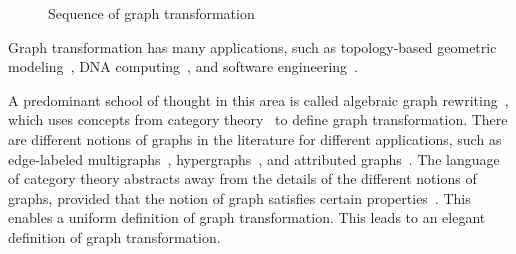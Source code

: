 \begin{figure}[H]
{
}
        \caption{Sequence of graph transformation}
        \label{fig:intro_sequence_of_transformation}
    \end{figure}


 Graph transformation has many applications, such as topology-based geometric modeling~\cite{poudret2007topology, belhaouari2014jerboa, bellet2017geometric, pascale2022Geometric_modeling}, DNA computing~\cite{harju2004tutorial_dna_computation}, and software engineering~\cite{heckel2020software_engineers}.
 
 A predominant school of thought in this area is called algebraic graph rewriting~\cite{ehrig1997handbook1,ehrig1999handbook2,ehrig1999handbook3}, which uses concepts from category theory~\cite{pierce1991basic,barr1990category,maclane2013categories} to define graph transformation. 
 There are different notions of graphs in the literature for different applications, such as edge-labeled multigraphs~\cite{konig2018atutorial,corradini1997algebraic}, hypergraphs~\cite{plump1993hypergraph}, and attributed graphs~\cite{ehrig2006fundamentals}. 
 The language of category theory abstracts away from the details of the different notions of graphs, provided that the notion of graph satisfies certain properties~\cite{lack2004adhesive,overbeek2023graph}.  
This enables a uniform definition of graph transformation.
 This leads to an elegant definition of graph transformation. 

